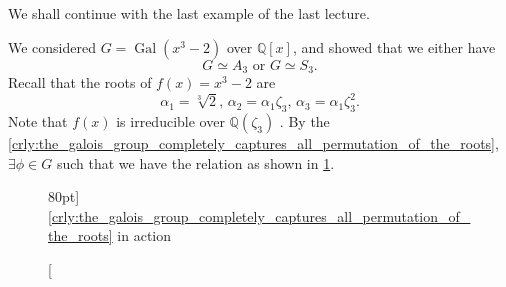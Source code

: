 \documentclass[notoc,notitlepage,nobib]{tufte-book}
\DeclareMathOperator{\Gal}{Gal}
\begin{document}
We shall continue with the last example of the last lecture.

\begin{eg}
  We considered $G = \Gal(x^3 - 2)$ over $\mathbb{Q}[x]$, and showed that we
  either have
  \begin{equation*}
    G \simeq A_3 \text{ or } G \simeq S_3.
  \end{equation*}
  Recall that the roots of $f(x) = x^3 - 2$ are
  \begin{equation*}
    \alpha_1 = \sqrt[3]{2}, \, \alpha_2 = \alpha_1 \zeta_3, \, \alpha_3 =
    \alpha_1 \zeta_3^2.
  \end{equation*}
  Note that $f(x)$ is irreducible over $\mathbb{Q}(\zeta_3)$
  . By the
  \cref{crly:the_galois_group_completely_captures_all_permutation_of_the_roots},
  $\exists \phi \in G$ such that we have the relation as shown in
  \cref{fig:crly_galois_group_has_all_permutations_in_action}.
  \begin{figure}[ht]
    \centering
    \caption[][80pt]{\cref{crly:the_galois_group_completely_captures_all_permutation_of_the_roots} in action}
    \label{fig:crly_galois_group_has_all_permutations_in_action}
  \end{figure}


\end{eg}
\end{document}
